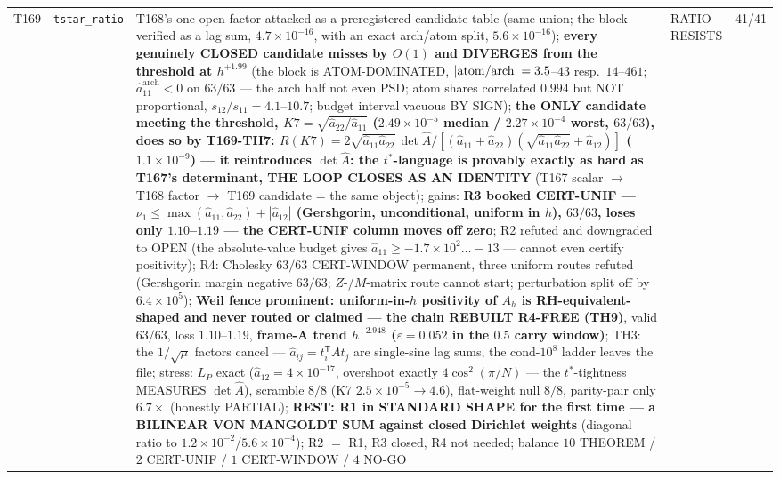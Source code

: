 \documentclass[11pt,a4paper]{article}
\begin{document}
{\begin{xltabular}{\linewidth}{@{}p{0.95cm} >{\raggedright\arraybackslash}p{3.1cm} Y >{\raggedright\scriptsize\arraybackslash}p{3.35cm} p{1.15cm}@{}}
T169 & \texttt{\scriptsize tstar\_\allowbreak ratio} & T168's one open factor attacked as a preregistered candidate table (same union; the block verified as a lag sum, $4.7\times10^{-16}$, with an exact arch/atom split, $5.6\times10^{-16}$); \textbf{every genuinely CLOSED candidate misses by $O(1)$ and DIVERGES from the threshold at $h^{+1.99}$} (the block is ATOM-DOMINATED, $|{\rm atom/arch}|=3.5$--$43$ resp.\ $14$--$461$; $\hat a_{11}^{\mathrm{arch}}<0$ on $63/63$ --- the arch half not even PSD; atom shares correlated $0.994$ but NOT proportional, $s_{12}/s_{11}=4.1$--$10.7$; budget interval vacuous BY SIGN); \textbf{the ONLY candidate meeting the threshold, $K7=\sqrt{\hat a_{22}/\hat a_{11}}$ ($2.49\times10^{-5}$ median / $2.27\times10^{-4}$ worst, $63/63$), does so by T169-TH7: $R(K7)=2\sqrt{\hat a_{11}\hat a_{22}}\,\det\hat A/[(\hat a_{11}+\hat a_{22})(\sqrt{\hat a_{11}\hat a_{22}}+\hat a_{12})]$ ($1.1\times10^{-9}$) --- it reintroduces $\det\hat A$: the $t^*$-language is provably exactly as hard as T167's determinant, THE LOOP CLOSES AS AN IDENTITY} (T167 scalar $\to$ T168 factor $\to$ T169 candidate = the same object); gains: \textbf{R3 booked CERT-UNIF --- $\nu_1\le\max(\hat a_{11},\hat a_{22})+|\hat a_{12}|$ (Gershgorin, unconditional, uniform in $h$), $63/63$, loses only $1.10$--$1.19$ --- the CERT-UNIF column moves off zero}; R2 refuted and downgraded to OPEN (the absolute-value budget gives $\hat a_{11}\ge-1.7\times10^{2}\ldots-13$ --- cannot even certify positivity); R4: Cholesky $63/63$ CERT-WINDOW permanent, three uniform routes refuted (Gershgorin margin negative $63/63$; $Z$-/$M$-matrix route cannot start; perturbation split off by $6.4\times10^{5}$); \textbf{Weil fence prominent: uniform-in-$h$ positivity of $A_h$ is RH-equivalent-shaped and never routed or claimed --- the chain REBUILT R4-FREE (TH9)}, valid $63/63$, loss $1.10$--$1.19$, \textbf{frame-A trend $h^{-2.948}$ ($\varepsilon=0.052$ in the $0.5$ carry window)}; TH3: the $1/\sqrt{\mu}$ factors cancel --- $\hat a_{ij}=t_i^{\mathsf T}At_j$ are single-sine lag sums, the cond-$10^{8}$ ladder leaves the file; stress: $L_P$ exact ($\hat a_{12}=4\times10^{-17}$, overshoot exactly $4\cos^2(\pi/N)$ --- the $t^*$-tightness MEASURES $\det\hat A$), scramble $8/8$ (K7 $2.5\times10^{-5}\to4.6$), flat-weight null $8/8$, parity-pair only $6.7\times$ (honestly PARTIAL); \textbf{REST: R1 in STANDARD SHAPE for the first time --- a BILINEAR VON MANGOLDT SUM against closed Dirichlet weights} (diagonal ratio to $1.2\times10^{-2}$/$5.6\times10^{-4}$); R2 $=$ R1, R3 closed, R4 not needed; balance $10$ THEOREM / $2$ CERT-UNIF / $1$ CERT-WINDOW / $4$ NO-GO & RATIO-RESISTS & 41/41\\

\end{xltabular}}
\end{document}
